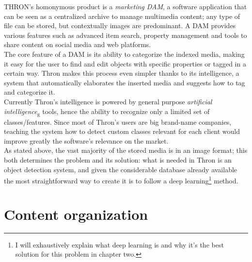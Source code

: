 THRON's homonymous product is a \emph{marketing DAM}, a software application that can be seen as a centralized archive to manage multimedia content; any type of file can be stored, but contextually images are predominant. A DAM provides various features such as advanced item search, property management and tools to share content on social media and web platforms. \\
The core feature of a DAM is its ability to categorize the indexed media, making it easy for the user to find and edit objects with specific properties or tagged in a certain way. Thron makes this process even simpler thanks to its intelligence, a system that automatically elaborates the inserted media and suggests how to tag and categorize it. \\
Currently Thron's intelligence is powered by general purpose \emph{\gls{artificial intelligence}}\textsubscript{g} tools, hence the ability to recognize only a limited set of classes/features. Since most of Thron's users are big brand-name companies, teaching the system how to detect custom classes relevant for each client would improve greatly the software's relevance on the market. \\
As stated above, the vast majority of the stored media is in an image format; this both determines the problem and its solution: what is needed in Thron is an object detection system, and given the considerable database already available the most straightforward way to create it is to follow a deep learning\footnote{I will exhaustively explain what deep learning is and why it's the best solution for this problem in chapter two.} method.



\section{Content organization}

